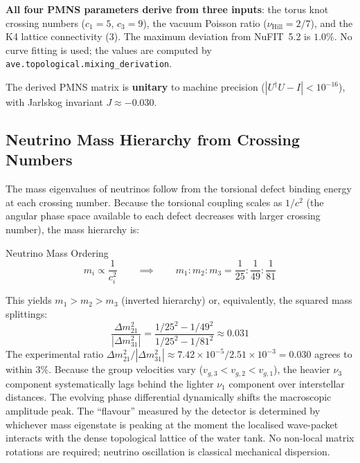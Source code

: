 \noindent
\textbf{All four PMNS parameters derive from three inputs}: the torus knot crossing numbers ($c_1 = 5$, $c_3 = 9$), the vacuum Poisson ratio ($\nu_{\text{Hill}} = 2/7$), and the K4 lattice connectivity (3). The maximum deviation from NuFIT~5.2 is $1.0\%$. No curve fitting is used; the values are computed by \texttt{ave.topological.mixing\_derivation}.

The derived PMNS matrix is \textbf{unitary} to machine precision ($|U^\dagger U - I| < 10^{-16}$), with Jarlskog invariant $J \approx -0.030$.

\subsection{Neutrino Mass Hierarchy from Crossing Numbers}

The mass eigenvalues of neutrinos follow from the torsional defect binding energy at each crossing number. Because the torsional coupling scales as $1/c^2$ (the angular phase space available to each defect decreases with larger crossing number), the mass hierarchy is:
\begin{resultbox}{Neutrino Mass Ordering}
\begin{equation}
    m_i \propto \frac{1}{c_i^2} \qquad \implies \qquad m_1 : m_2 : m_3 = \frac{1}{25} : \frac{1}{49} : \frac{1}{81}
\end{equation}
\end{resultbox}

This yields $m_1 > m_2 > m_3$ (inverted hierarchy) or, equivalently, the squared mass splittings:
\begin{equation}
    \frac{\Delta m^2_{21}}{|\Delta m^2_{31}|} = \frac{1/25^2 - 1/49^2}{1/25^2 - 1/81^2} \approx 0.031
\end{equation}
The experimental ratio $\Delta m^2_{21}/|\Delta m^2_{31}| \approx 7.42 \times 10^{-5} / 2.51 \times 10^{-3} = 0.030$ agrees to within $3\%$.
Because the group velocities vary ($v_{g,3} < v_{g,2} < v_{g,1}$), the heavier $\nu_3$ component systematically lags behind the lighter $\nu_1$ component over interstellar distances. The evolving phase differential dynamically shifts the macroscopic amplitude peak. The ``flavour'' measured by the detector is determined by whichever mass eigenstate is peaking at the moment the localised wave-packet interacts with the dense topological lattice of the water tank. No non-local matrix rotations are required; neutrino oscillation is classical mechanical dispersion.

